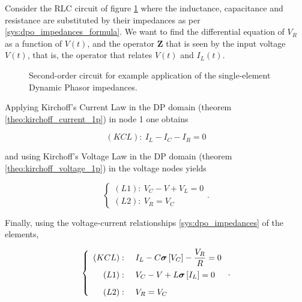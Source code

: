 \begin{example} \label{example:dynimp_rlc} %

	Consider the RLC circuit of figure \ref{fig:dpimp_example} where the inductance, capacitance and resistance are substituted by their impedances as per \eqref{sys:dpo_impedances_formula}. We want to find the differential equation of $V_R$ as a function of $V(t)$, and the operator $\mathbf{Z}$ that is seen by the input voltage $V(t)$, that is, the operator that relates $V(t)$ and $I_L(t)$.

\begin{figure}[h]
\centering
	\caption{Second-order circuit for example application of the single-element Dynamic Phasor impedances.}
	\label{fig:dpimp_example}
\end{figure} %

	Applying Kirchoff's Current Law in the DP domain (theorem \ref{theo:kirchoff_current_1p}) in node 1 one obtains

\begin{equation} (KCL):\  I_L - I_C - I_R = 0\end{equation}

	\noindent and using Kirchoff's Voltage Law in the DP domain (theorem \ref{theo:kirchoff_voltage_1p}) in the voltage nodes yields

\begin{equation}\left\{\begin{array}{l} (L1):\ V_C - V + V_L = 0 \\[3mm] (L2):\ V_R = V_C \end{array}\right. .\end{equation}

	Finally, using the voltage-current relationships \eqref{sys:dpo_impedances} of the elements,

\begin{equation}\left\{\begin{array}{rl} (KCL):&\ I_L - C\dpo\left[V_C\right] - \dfrac{V_R}{R} = 0 \\[3mm] (L1):&\ V_C - V + L\dpo\left[I_L\right] = 0 \\[3mm] (L2):&\ V_R = V_C \end{array}\right. .\end{equation}


\end{example}
